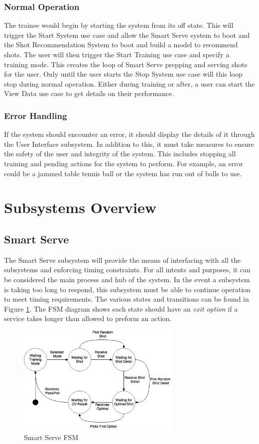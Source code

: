 \documentclass[11pt]{article}
\begin{document}
\subsubsection{Normal Operation}
The trainee would begin by starting the system from its off state. This will trigger the Start System use case and allow the Smart Serve system to boot and the Shot Recommendation System to boot and build a model to recommend shots. The user will then trigger the Start Training use case and specify a training mode. This creates the loop of Smart Serve prepping and serving shots for the user. Only until the user starts the Stop System use case will this loop stop during normal operation. Either during training or after, a user can start the View Data use case to get details on their performance.
\subsubsection{Error Handling}
If the system should encounter an error, it should display the details of it through the User Interface subsystem. In addition to this, it must take measures to ensure the safety of the user and integrity of the system. This includes stopping all training and pending actions for the system to perform. For example, an error could be a jammed table tennis ball or the system has run out of balls to use.
\section{Subsystems Overview}
\subsection{Smart Serve}
The Smart Serve subsystem will provide the means of interfacing with all the subsystems and enforcing timing constraints. For all intents and purposes, it can be considered the main process and hub of the system. In the event a subsystem is taking too long to respond, this subsystem must be able to continue operation to meet timing requirements. The various states and transitions can be found in Figure \ref{fig:fsm}. The FSM diagram shows each state should have an \textit{exit option} if a service takes longer than allowed to preform an action.
\begin{figure}[htbp]
   \centering
   \includegraphics[width=0.7\textwidth]{img/FSM.png}
   \caption{Smart Serve FSM}
   \label{fig:fsm}
\end{figure}
\end{document}
